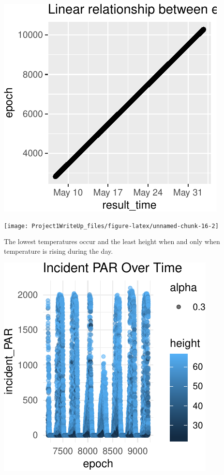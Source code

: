 \documentclass[]{article}
\begin{document}
\begin{center}\includegraphics{Project1WriteUp_files/figure-latex/unnamed-chunk-16-1} \end{center}

\begin{center}\texttt{[image: Project1WriteUp\_files/figure-latex/unnamed-chunk-16-2]} \end{center}

The lowest temperatures occur and the least height when and only when
temperature is rising during the day.

\begin{center}\includegraphics{Project1WriteUp_files/figure-latex/unnamed-chunk-17-1} \end{center}
\end{document}

